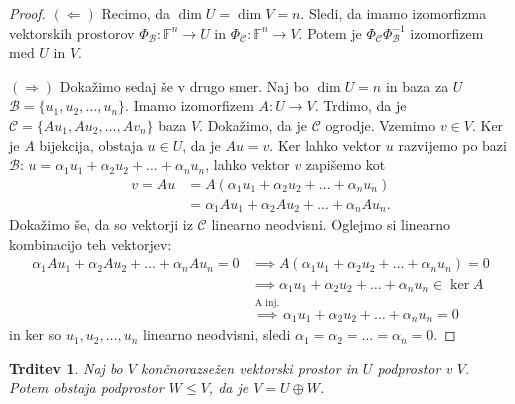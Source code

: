\documentclass[10pt, a4paper]{article}
\newtheorem{trditev}[izr]{Trditev}
\newenvironment{noticeC}{%
  \tcolorbox[%
  notitle,
  empty,
  enhanced,  %
  breakable,
  coltext=black, 
  fontupper=\rmfamily,
  parbox=false,
  noparskip,
  sharp corners,
  boxrule=-1pt,  %
  frame hidden,
  left=7pt,  %
  right=7pt,
  top=5pt,
  bottom=5pt,
  before skip=2.5ex plus 2pt,
  after skip=2.5ex plus 2pt,
  overlay unbroken and last={%
  },
  ]}
{\endtcolorbox}
\newenvironment{dokaz}%
  {\begin{noticeC}\begin{proof}}%
  {\end{proof}\end{noticeC}}
\newcommand{\F}{\mathbb {F}}
\begin{document}
\begin{dokaz}
    $(\Leftarrow)$ Recimo, da $\dim U = \dim V = n$.
    Sledi, da imamo izomorfizma vektorskih prostorov $\Phi_\mathcal{B} : \F^n \rightarrow U$ in $\Phi_\mathcal{C} : \F^n \rightarrow V$.
    Potem je $\Phi_\mathcal{C} \Phi_\mathcal{B}^{-1}$ izomorfizem med $U$ in $V$.

    $(\Rightarrow)$ Dokažimo sedaj še v drugo smer.
    Naj bo $\dim U = n$ in baza za $U$ $\mathcal{B} = \{u_1, u_2, \dots, u_n\}$.
    Imamo izomorfizem $A : U \rightarrow V$. Trdimo, da je $\mathcal{C} = \{Au_1, A u_2, \dots, A v_n\}$ baza $V$.
    Dokažimo, da je $\mathcal{C}$ ogrodje. Vzemimo $v \in V$. Ker je $A$ bijekcija, obstaja $u \in U$, da je $Au = v$.
        Ker lahko vektor $u$ razvijemo po bazi $\mathcal{B}$: $u = \alpha_1 u_1 + \alpha_2 u_2 + \dots + \alpha_n u_n$, lahko vektor $v$ zapišemo kot
        \begin{align*}
            v = Au &= A(\alpha_1 u_1 + \alpha_2 u_2 + \dots + \alpha_n u_n)\\
             &= \alpha_1 A u_1 + \alpha_2 A u_2 + \dots + \alpha_n A u_n.
        \end{align*}
    Dokažimo še, da so vektorji iz $\mathcal{C}$ linearno neodvisni. Oglejmo si linearno kombinacijo teh vektorjev:
        \begin{align*}
            \alpha_1 Au_1 + \alpha_2 Au_2 + \dots + \alpha_n A u_n = 0 &\implies A (\alpha_1 u_1 + \alpha_2 u_2 + \dots + \alpha_n u_n) = 0\\
            &\implies \alpha_1 u_1 + \alpha_2 u_2 + \dots + \alpha_n u_n \in \ker A\\
            &\stackrel{\text{A inj.}}{\implies} \alpha_1 u_1 + \alpha_2 u_2 + \dots + \alpha_n u_n = 0
        \end{align*}
        in ker so $u_1, u_2, \dots, u_n$ linearno neodvisni, sledi $\alpha_1 = \alpha_2 = \dots = \alpha_n = 0$. 
\end{dokaz}

\begin{trditev}
    Naj bo $V$ končnorazsežen vektorski prostor in $U$ podprostor v $V$.
    Potem obstaja podprostor $W \leq V$, da je $V = U \oplus W$.
\end{trditev}
\end{document}
